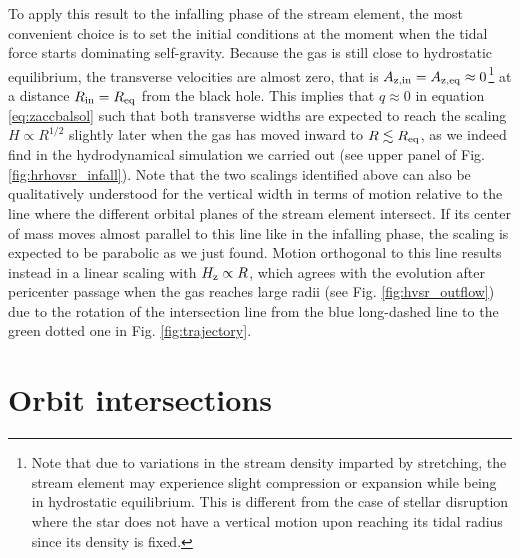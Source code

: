 \documentclass[a4paper,fleqn,usenatbib]{mnras}
\begin{document}
To apply this result to the infalling phase of the stream element, the most convenient choice is to set the initial conditions at the moment when the tidal force starts dominating self-gravity. Because the gas is still close to hydrostatic equilibrium, the transverse velocities are almost zero, that is $A_{\rm z,in} = A_{\rm z,eq} \approx 0$\footnote{Note that due to variations in the stream density imparted by stretching, the stream element may experience slight compression or expansion while being in hydrostatic equilibrium. This is different from the case of stellar disruption where the star does not have a vertical motion upon reaching its tidal radius since its density is fixed.} at a distance $R_{\rm in} = R_{\rm eq}$ from the black hole. This implies that $q \approx 0$ in equation \eqref{eq:zaccbalsol} such that both transverse widths are expected to reach the scaling $H \propto R^{1/2}$ slightly later when the gas has moved inward to $R\lesssim R_{\rm eq}$, as we indeed find in the hydrodynamical simulation we carried out (see upper panel of Fig. \ref{fig:hrhovsr_infall}). Note that the two scalings identified above can also be qualitatively understood for the vertical width in terms of motion relative to the line where the different orbital planes of the stream element intersect. If its center of mass moves almost parallel to this line like in the infalling phase, the scaling is expected to be parabolic as we just found. Motion orthogonal to this line results instead in a linear scaling with $H_{\rm z} \propto R$, which agrees with the evolution after pericenter passage when the gas reaches large radii (see Fig. \ref{fig:hvsr_outflow}) due to the rotation of the intersection line from the blue long-dashed line to the green dotted one in Fig. \ref{fig:trajectory}.










\section{Orbit intersections}
\label{ap:intersections}
\end{document}
